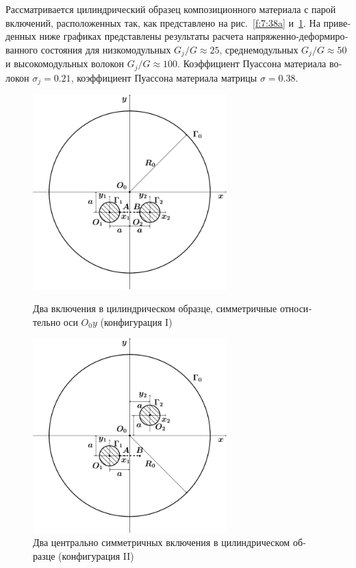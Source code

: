 \begin{russian}
Рассматривается цилиндрический образец композиционного материала с парой включений, расположенных так, как представлено на рис.~\ref{f:7:38a} и~\ref{f:7:38b}. На приведенных ниже графиках представлены результаты расчета на\-пря\-же\-н\-но-де\-фор\-ми\-ро\-ва\-н\-но\-го состояния для низкомодульных $G_j/G\approx 25$, среднемодульных $G_j/G\approx 50$ и высокомодульных волокон $G_j/G\approx 100$. Коэффициент Пуассона материала волокон $\sigma_j=0.21$, коэффициент Пуассона материала матрицы $\sigma=0.38$.



\begin{figure}
\centering\footnotesize
\parbox[b]{7.5cm}{\centering\includegraphics[width=7.5cm]{inc2a.pdf}
\caption{Два включения в цилиндрическом образце, симметричные относительно оси $O_0y$ (конфигурация I)
\label{f:7:38a}}}\hfil\hfil
\parbox[b]{7.5cm}{\centering\includegraphics[width=7.5cm]{inc2b.pdf}
\caption{Два центрально симметричных включения в цилиндрическом образце (конфигурация II)
\label{f:7:38b}}}
\end{figure}


\end{russian}
